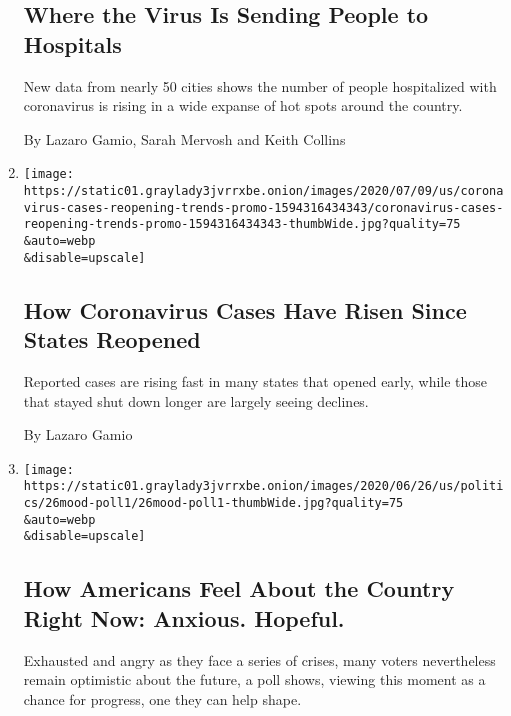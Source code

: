 \begin{enumerate}
  \hypertarget{where-the-virus-is-sending-people-to-hospitals}{%
  \subsection{Where the Virus Is Sending People to
  Hospitals}\label{where-the-virus-is-sending-people-to-hospitals}}

  New data from nearly 50 cities shows the number of people hospitalized
  with coronavirus is rising in a wide expanse of hot spots around the
  country.

  By Lazaro Gamio, Sarah Mervosh and Keith Collins
\item
  \href{/interactive/2020/07/09/us/coronavirus-cases-reopening-trends.html}{}

  \texttt{[image: https://static01.graylady3jvrrxbe.onion/images/2020/07/09/us/coronavirus-cases-reopening-trends-promo-1594316434343/coronavirus-cases-reopening-trends-promo-1594316434343-thumbWide.jpg?quality=75\\\&auto=webp\\\&disable=upscale]}

  \hypertarget{how-coronavirus-cases-have-risen-since-states-reopened}{%
  \subsection{How Coronavirus Cases Have Risen Since States
  Reopened}\label{how-coronavirus-cases-have-risen-since-states-reopened}}

  Reported cases are rising fast in many states that opened early, while
  those that stayed shut down longer are largely seeing declines.

  By Lazaro Gamio
\item
  \href{/2020/06/27/us/politics/coronavirus-trump-mood-poll.html}{}

  \texttt{[image: https://static01.graylady3jvrrxbe.onion/images/2020/06/26/us/politics/26mood-poll1/26mood-poll1-thumbWide.jpg?quality=75\\\&auto=webp\\\&disable=upscale]}

  \hypertarget{how-americans-feel-about-the-country-right-now-anxious-hopeful}{%
  \subsection{How Americans Feel About the Country Right Now: Anxious.
  Hopeful.}\label{how-americans-feel-about-the-country-right-now-anxious-hopeful}}

  Exhausted and angry as they face a series of crises, many voters
  nevertheless remain optimistic about the future, a poll shows, viewing
  this moment as a chance for progress, one they can help shape.


\end{enumerate}
